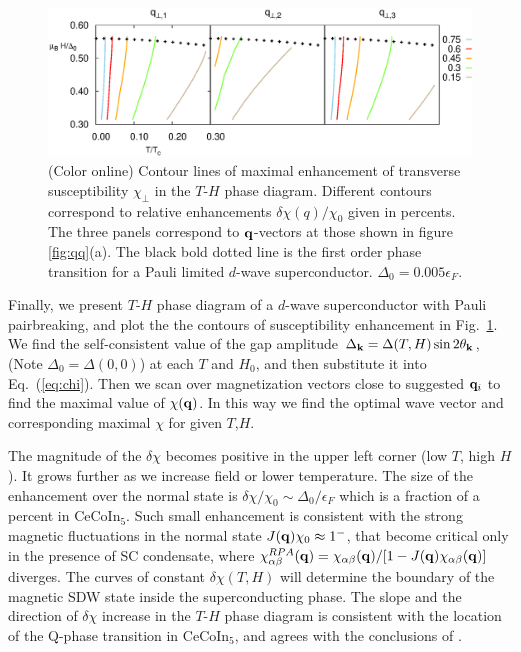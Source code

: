 \documentclass[aps,prl,twocolumn,showpacs,amsmath,amssymb]{revtex4-1}
\newcommand{\cecoin}{CeCoIn$_5$}
\begin{document}
\begin{figure}[t]
\includegraphics[width=\linewidth]{Fig4.eps}
\caption{ 
	\label{fig:ph.d} 
	(Color online) 
	Contour lines of maximal enhancement of transverse susceptibility $\chi_\perp$ in the $T$-$H$ 
	phase diagram. Different contours correspond to relative enhancements 
	$\delta\chi(q)/\chi_0$ given in percents. 
	The three panels correspond to ${\bf q}$-vectors at those shown in figure \ref{fig:qq}(a). 
	The black bold dotted line is the first order phase transition
	for a Pauli limited $d$-wave superconductor. $\Delta_0 = 0.005\epsilon_F$.
}
\end{figure}
 
%
Finally, we present $T$-$H$ phase diagram of a $d$-wave superconductor with Pauli pairbreaking, 
and plot the the contours of susceptibility enhancement in Fig.~\ref{fig:ph.d}. 
We find the self-consistent value of the 
gap amplitude $\Delta_{\bf k} = \Delta(T,H) \sin2\theta_{\bf k}$, (Note $\Delta_0 = \Delta(0,0)$) 
at each $T$ and $H_0$, and then substitute it into Eq.~(\ref{eq:chi}). 
Then we scan over magnetization vectors close to suggested ${\bf q}_i$ to find the maximal value of 
$\chi({\bf q})$. In this way we find the optimal wave vector and corresponding maximal $\chi$ for 
given $T$,$H$. 

The magnitude of the $\delta \chi$ becomes positive in the 
upper left corner (low $T$, high $H$). It grows further as we increase field or  
lower temperature. The size of the enhancement over the normal state is 
$\delta\chi/\chi_0 \sim \Delta_0/\epsilon_F$ which is a fraction of a percent in \cecoin. 
Such small enhancement is consistent with the strong magnetic fluctuations in the normal 
state $J({\bf q}) \chi_0 \approx 1^-$, that become critical only in the presence of SC condensate, where 
$\chi^{RPA}_{\alpha\beta}({\bf q})={\chi_{\alpha\beta} ({\bf q}) }/{[1-J({\bf q}) \chi_{\alpha\beta}({\bf q})]}$
diverges. 
The curves of constant 
$\delta\chi(T,H)$ will determine the boundary of the magnetic SDW 
state inside the superconducting phase. 
The slope and the direction of $\delta\chi$ increase in the $T$-$H$ phase diagram is consistent with 
the location of the Q-phase transition in \cecoin, and agrees with the conclusions of 
\cite{kato11_sc_afm}. 
\end{document}
